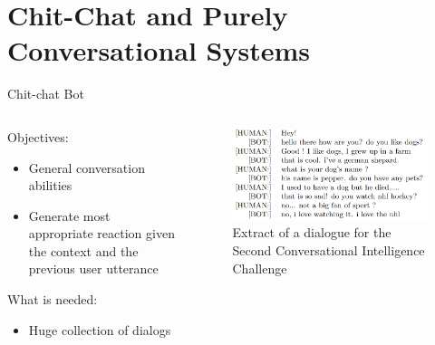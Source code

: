 \documentclass[10pt,aspectratio=169]{beamer}
\begin{document}
\section{Chit-Chat and Purely Conversational Systems}
\begin{frame}{Chit-chat Bot}
\begin{columns}
        \begin{column}{0.5\textwidth}
            \begin{block}{Objectives:}
                \begin{itemize}
                    \item General conversation abilities
                    \item Generate most appropriate reaction given the context and the previous user utterance
                \end{itemize}
            \end{block}
            \begin{block}{What is needed:}
                \begin{itemize}
                    \item Huge collection of dialogs
                \end{itemize}
            \end{block}
        \end{column}
        \begin{column}{0.5\textwidth}
            \begin{figure}
                \centering
                \includegraphics[width=1.\textwidth]{media/chichat_exemple.png}
                \caption{Extract of a dialogue for the Second Conversational Intelligence Challenge \cite{convaichallenge}}
                \label{fig:my_label}
            \end{figure}
        \end{column}
    \end{columns}
\end{frame}
\end{document}
